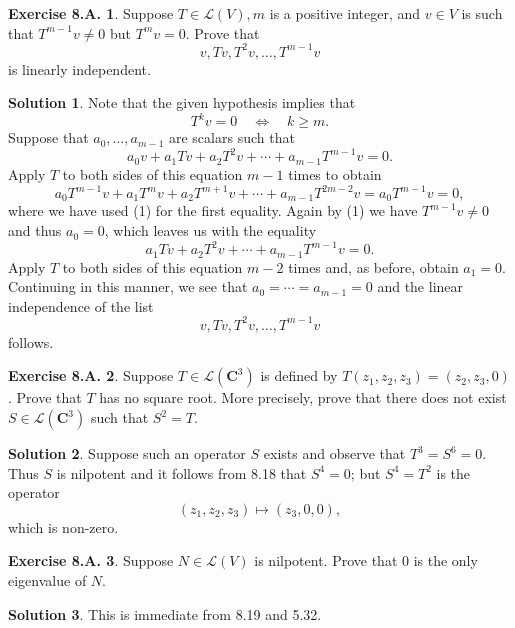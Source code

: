 \documentclass[12pt]{article}
\theoremstyle{definition}
\theoremstyle{exercise}
\newtheorem{exercise}{Exercise 8.A.}
\theoremstyle{solution}
\newtheorem*{solution}{Solution}
\newcommand{\lmap}{\mathcal{L}}
\newcommand{\quiff}{\quad \iff \quad}
\newcommand{\C}{\mathbf{C}}
\begin{document}
\begin{exercise}
\label{ex:5}
    Suppose \( T \in \lmap(V), m \) is a positive integer, and \( v \in V \) is such that \( T^{m-1} v \neq 0 \) but \( T^m v = 0 \). Prove that
    \[
        v, Tv, T^2 v, \ldots, T^{m-1} v
    \]
    is linearly independent.
\end{exercise}

\begin{solution}
    Note that the given hypothesis implies that
    \[
        T^k v = 0 \quiff k \geq m. \tag{1}
    \]
    Suppose that \( a_0, \ldots, a_{m-1} \) are scalars such that
    \[
        a_0 v + a_1 T v + a_2 T^2 v + \cdots + a_{m-1} T^{m-1} v = 0.
    \]
    Apply \( T \) to both sides of this equation \( m - 1 \) times to obtain
    \[
        a_0 T^{m-1} v + a_1 T^m v + a_2 T^{m+1} v + \cdots + a_{m-1} T^{2m-2} v = a_0 T^{m-1} v = 0,
    \]
    where we have used (1) for the first equality. Again by (1) we have \( T^{m-1} v \neq 0 \) and thus \( a_0 = 0 \), which leaves us with the equality
    \[
        a_1 T v + a_2 T^2 v + \cdots + a_{m-1} T^{m-1} v = 0.
    \]
    Apply \( T \) to both sides of this equation \( m - 2 \) times and, as before, obtain \( a_1 = 0 \). Continuing in this manner, we see that \( a_0 = \cdots = a_{m-1} = 0 \) and the linear independence of the list
    \[
        v, Tv, T^2 v, \ldots, T^{m-1} v
    \]
    follows.
\end{solution}

\begin{exercise}
\label{ex:6}
    Suppose \( T \in \lmap(\C^3) \) is defined by \( T(z_1, z_2, z_3) = (z_2, z_3, 0) \). Prove that \( T \) has no square root. More precisely, prove that there does not exist \( S \in \lmap(\C^3) \) such that \( S^2 = T \).
\end{exercise}

\begin{solution}
    Suppose such an operator \( S \) exists and observe that \( T^3 = S^6 = 0 \). Thus \( S \) is nilpotent and it follows from 8.18 that \( S^4 = 0 \); but \( S^4 = T^2 \) is the operator
    \[
        (z_1, z_2, z_3) \mapsto (z_3, 0, 0),  
    \]
    which is non-zero.
\end{solution}

\begin{exercise}
\label{ex:7}
    Suppose \( N \in \lmap(V) \) is nilpotent. Prove that 0 is the only eigenvalue of \( N \).
\end{exercise}

\begin{solution}
    This is immediate from 8.19 and 5.32.
\end{solution}
\end{document}
